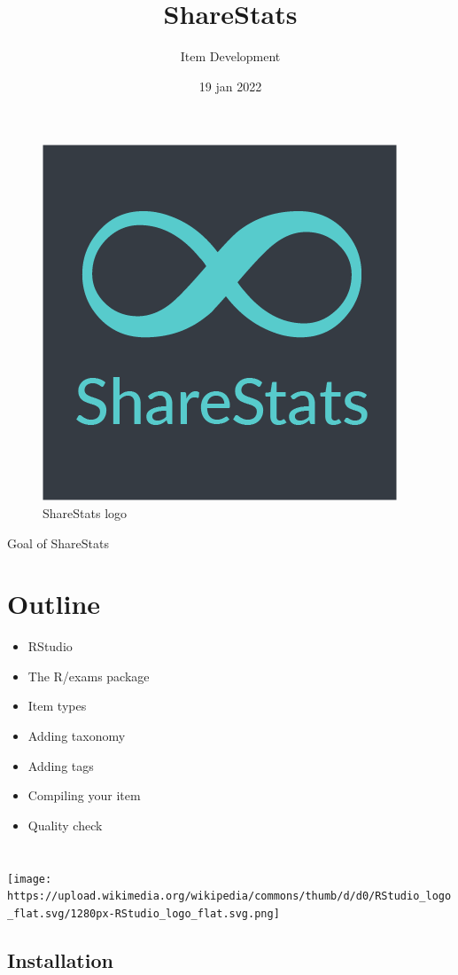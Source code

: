 \documentclass[
]{article}
\title{ShareStats}
\subtitle{Item Development}
\author{}
\date{\vspace{-2.5em}19 jan 2022}
\providecommand{\tightlist}{%
  \setlength{\itemsep}{0pt}\setlength{\parskip}{0pt}}
\begin{document}
\maketitle

{
\setcounter{tocdepth}{2}
\tableofcontents
}
\hypertarget{section}{%
\section{}\label{section}}

\begin{figure}
\includegraphics[width=0.2\linewidth]{images/InfShareStatsSquare} \caption{ShareStats logo}\label{fig:unnamed-chunk-3}
\end{figure}

Goal of ShareStats

\hypertarget{outline}{%
\section{Outline}\label{outline}}

\begin{itemize}
\tightlist
\item
  RStudio
\item
  The R/exams package
\item
  Item types
\item
  Adding taxonomy
\item
  Adding tags
\item
  Compiling your item
\item
  Quality check
\end{itemize}

\hypertarget{section-1}{%
\section{}\label{section-1}}

\texttt{[image: https://upload.wikimedia.org/wikipedia/commons/thumb/d/d0/RStudio\_logo\_flat.svg/1280px-RStudio\_logo\_flat.svg.png]}

\hypertarget{installation}{%
\subsection{Installation}\label{installation}}
\end{document}

